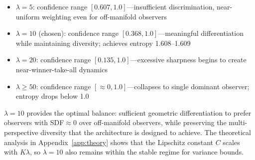 \documentclass[10pt,twocolumn,letterpaper]{article}
\begin{document}
\begin{itemize}
\item $\lambda=5$: confidence range $[0.607, 1.0]$---insufficient discrimination, near-uniform weighting even for off-manifold observers
\item $\lambda=10$ (chosen): confidence range $[0.368, 1.0]$---meaningful differentiation while maintaining diversity; achieves entropy 1.608--1.609
\item $\lambda=20$: confidence range $[0.135, 1.0]$---excessive sharpness begins to create near-winner-take-all dynamics
\item $\lambda \geq 50$: confidence range $[\approx 0, 1.0]$---collapses to single dominant observer; entropy drops below 1.0
\end{itemize}

$\lambda=10$ provides the optimal balance: sufficient geometric differentiation to prefer observers with SDF$\approx 0$ over off-manifold observers, while preserving the multi-perspective diversity that the architecture is designed to achieve. The theoretical analysis in Appendix~\ref{app:theory} shows that the Lipschitz constant $C$ scales with $K\lambda$, so $\lambda=10$ also remains within the stable regime for variance bounds.



\end{document}
